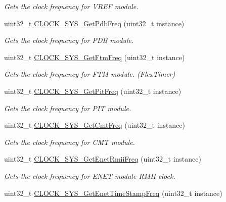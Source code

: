 \begin{DoxyCompactItemize}
\begin{DoxyCompactList}\small\item\em Gets the clock frequency for V\+R\+EF module. \end{DoxyCompactList}\item 
uint32\+\_\+t \hyperlink{group__clock__manager_gae9c588ebb1d1c1bca223aad0de7bbb23}{C\+L\+O\+C\+K\+\_\+\+S\+Y\+S\+\_\+\+Get\+Pdb\+Freq} (uint32\+\_\+t instance)
\begin{DoxyCompactList}\small\item\em Gets the clock frequency for P\+DB module. \end{DoxyCompactList}\item 
uint32\+\_\+t \hyperlink{group__clock__manager_ga4a1ca66f85cd6f6aa8a5583a82cf965a}{C\+L\+O\+C\+K\+\_\+\+S\+Y\+S\+\_\+\+Get\+Ftm\+Freq} (uint32\+\_\+t instance)
\begin{DoxyCompactList}\small\item\em Gets the clock frequency for F\+TM module. (Flex\+Timer) \end{DoxyCompactList}\item 
uint32\+\_\+t \hyperlink{group__clock__manager_gae2049dbfec3d86591dfcd6f136ac1343}{C\+L\+O\+C\+K\+\_\+\+S\+Y\+S\+\_\+\+Get\+Pit\+Freq} (uint32\+\_\+t instance)
\begin{DoxyCompactList}\small\item\em Gets the clock frequency for P\+IT module. \end{DoxyCompactList}\item 
uint32\+\_\+t \hyperlink{group__clock__manager_gaa3ca55e46cb716b5ace08fcc33022572}{C\+L\+O\+C\+K\+\_\+\+S\+Y\+S\+\_\+\+Get\+Cmt\+Freq} (uint32\+\_\+t instance)
\begin{DoxyCompactList}\small\item\em Gets the clock frequency for C\+MT module. \end{DoxyCompactList}\item 
uint32\+\_\+t \hyperlink{group__clock__manager_gaa3c033906c2640a35f3583f05439953d}{C\+L\+O\+C\+K\+\_\+\+S\+Y\+S\+\_\+\+Get\+Enet\+Rmii\+Freq} (uint32\+\_\+t instance)
\begin{DoxyCompactList}\small\item\em Gets the clock frequency for E\+N\+ET module R\+M\+II clock. \end{DoxyCompactList}\item 
uint32\+\_\+t \hyperlink{group__clock__manager_ga9b54b729ff53829343fd807c97b90385}{C\+L\+O\+C\+K\+\_\+\+S\+Y\+S\+\_\+\+Get\+Enet\+Time\+Stamp\+Freq} (uint32\+\_\+t instance)

\end{DoxyCompactItemize}

